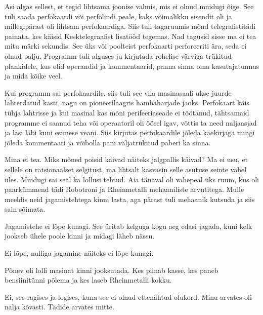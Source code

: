 Asi algas sellest, et tegid lihtsama joonise valmis, mis ei olnud 
muidugi õige. See tuli saada perfokaardi või perfolindi peale, kaks 
võimalikku sisendit oli ja millegipärast oli lihtsam perfokaardiga. Siis tuli 
tagaruumis mõnd telegrafistitädi painata, kes käisid Kesktelegraafist 
lisatööd tegemas. Nad tagusid sisse ma ei tea mitu 
märki sekundis. See üks või poolteist perfokaarti perforeeriti ära, seda ei 
olnud palju. Programm tuli alguses ju kirjutada 
rohelise värviga trükitud plankidele, kus olid operandid ja kommentaarid, 
panna sinna oma kasutajatunnus ja mida kõike veel. 

Kui programm sai 
perfokaardile, siis tuli see viia
masinasaali ukse juurde lahterdatud kasti, nagu on pioneerilaagris 
hambaharjade jaoks. Perfokaart käis tühja lahtrisse ja kui masinal kas mõni 
perifeeriaseade ei töötanud, tähtsamaid programme ei saanud teha või 
operaatoril oli öösel igav, võttis ta need naljaasjad ja lasi läbi kuni 
esimese veani. Siis kirjutas perfokaardile jõleda käekirjaga mingi jõleda 
kommentaari ja võibolla pani väljatrükitud paberi ka sinna. 


Mina ei tea. Miks mõned poisid käivad näiteks jalgpallis käivad? Ma ei usu, 
et sellele on ratsionaalset selgitust, ma lihtsalt kasvasin selle asutuse seinte vahel 
üles. Muidugi sai seal ka lollusi tehtud. Aia tänaval oli 
vahepeal üks ruum, kus oli paarkümmend tädi Robotroni ja Rheinmetalli 
mehaaniliste arvutitega. Mulle meeldis neid jagamistehtega kinni lasta, aga 
pärast tuli mehaanik kutsuda ja siis sain sõimata. 


Jagamistehe ei lõpe kunagi. See üritab kelguga kogu aeg edasi jagada, kuni 
kelk jookseb ühele poole kinni ja midagi läheb nässu.


Ei lõpe, nulliga jagamine näiteks ei lõpe kunagi. 


Põnev oli lolli masinat kinni jooksutada. Kes piinab kasse, 
kes paneb bensiinitünni põlema ja kes laseb Rheinmetalli kokku.


Ei, see ragises ja logises, kuna see ei olnud ettenähtud olukord. Minu arvates oli 
nalja kõvasti. Tädide arvates mitte. 

